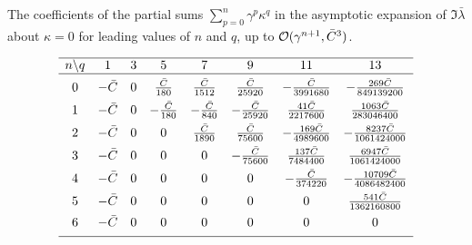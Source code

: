 \documentclass[12pt,a5paper]{article}
\begin{document}
\begin{table}
\caption{The coefficients of the partial sums $\sum_{p=0}^{n}\gamma^p\kappa^q$ in the 
asymptotic expansion of $\Im\bar{\lambda}$ about $\kappa=0$ 
for leading values of $n$ and $q$, up to ${\cal O}(\gamma^{n+1},\bar{C}^3)$.}
\label{tab:partial:kappa:im}
\centering
\[
\begin{array}{cccccccc}
\hline
n\backslash q & 1 & 3 & 5 & 7 & 9 & 11 & 13\\
\hline
&&&&&&&\\[-2ex]
0 & -\bar{C} & 0 & \frac{\bar{C}}{180} & \frac{\bar{C}}{1512} & \frac{\bar{C}}{25920}
   & -\frac{\bar{C}}{3991680} & -\frac{269\bar{C}}{849139200}
\\[1ex]
1 & -\bar{C} & 0 & -\frac{\bar{C}}{180} & -\frac{\bar{C}}{840} & -\frac{\bar{C}}{25920}
   & \frac{41\bar{C}}{2217600} & \frac{1063\bar{C}}{283046400}
\\[1ex]
2 & -\bar{C} & 0 & 0 & \frac{\bar{C}}{1890} & \frac{\bar{C}}{75600}
   & -\frac{169\bar{C}}{4989600} & -\frac{8237\bar{C}}{1061424000}
\\[1ex]
3 & -\bar{C} & 0 & 0 & 0 & -\frac{\bar{C}}{75600}
   & \frac{137\bar{C}}{7484400} & \frac{6947\bar{C}}{1061424000}
\\[1ex]
4 & -\bar{C} & 0 & 0 & 0 & 0
   & -\frac{\bar{C}}{374220} & -\frac{10709\bar{C}}{4086482400}
\\[1ex]
5 & -\bar{C} & 0 & 0 & 0 & 0 & 0 & \frac{541\bar{C}}{1362160800}
\\[1ex]
6 & -\bar{C} & 0 & 0 & 0 & 0 & 0 & 0
\\[1ex]
\hline
\end{array}
\]
\end{table}
\end{document}
